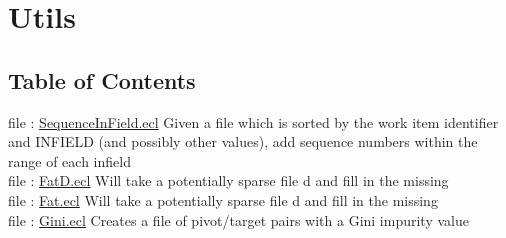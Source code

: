 \chapter*{Utils}
\hypertarget{ML_Core/Utils}{}


\section*{Table of Contents}
file : \hyperlink{ML_Core.Utils.SequenceInField}{SequenceInField.ecl}  Given a file which is sorted by the work item identifier and INFIELD (and possibly other values), add sequence numbers within the range of each infield \\
file : \hyperlink{ML_Core.Utils.FatD}{FatD.ecl}  Will take a potentially sparse file d and fill in the missing \\
file : \hyperlink{ML_Core.Utils.Fat}{Fat.ecl}  Will take a potentially sparse file d and fill in the missing \\
file : \hyperlink{ML_Core.Utils.Gini}{Gini.ecl}  Creates a file of pivot/target pairs with a Gini impurity value \\






